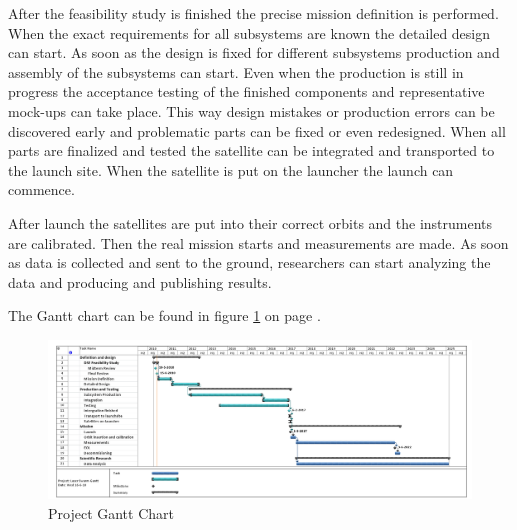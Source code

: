 After the feasibility study is finished the precise mission definition is performed. When the exact requirements for all subsystems are known the detailed design can start. As soon as the design is fixed for different subsystems production and assembly of the subsystems can start. Even when the production is still in progress the acceptance testing of the finished components and representative mock-ups can take place. This way design mistakes or production errors can be discovered early and problematic parts can be fixed or even redesigned. When all parts are finalized and tested the satellite can be integrated and transported to the launch site. When the satellite is put on the launcher the launch can commence.

After launch the satellites are put into their correct orbits and the instruments are calibrated. Then the real mission starts and measurements are made. As soon as data is collected and sent to the ground, researchers can start analyzing the data and producing and publishing results. 

The Gantt chart can be found in figure \ref{ganttchart} on page \pageref{ganttchart}.

\begin{figure}
\centering
\includegraphics[width=1.2\textwidth, angle=90]{chapters/img/projectganttchart.png}
\caption{Project Gantt Chart}
\label{ganttchart}
\end{figure}